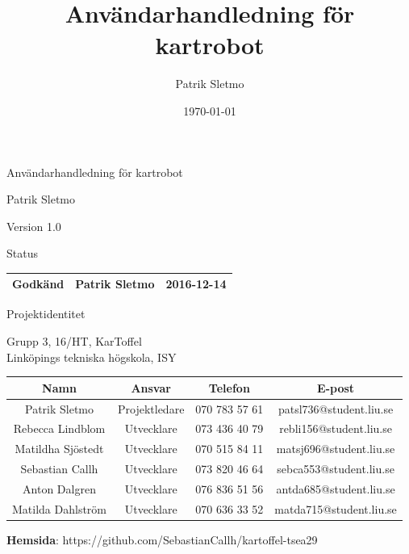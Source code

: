 \documentclass{article}
\title{Användarhandledning för kartrobot}
\author{Patrik Sletmo}
\date{\today}
\begin{document}
\thispagestyle{empty}

{
\sffamily
\centering
\large


{\huge 
Användarhandledning för kartrobot
}

{\large
Patrik Sletmo
}

{\large
Version 1.0
}

\vspace{3.5cm}

Status
\begin{table}[H]
\centering
\begin{tabular}{ | c | c | c | }
\hline
Godkänd & Patrik Sletmo & 2016-12-14 \\
\hline
\end{tabular}
\end{table}
}
\clearpage

\vspace*{\fill}
{
\sffamily
\centering
\large


{\huge
Projektidentitet
}

{\large
Grupp 3, 16/HT, KarToffel \\ Linköpings tekniska högskola, ISY
}

\vspace{0.5cm}

\begin{table}[H]
\centering
\begin{tabular}{ | c | c | c | c |}
\hline
Namn & Ansvar & Telefon & E-post \\
\hline
Patrik Sletmo & Projektledare & 070 783 57 61 & patsl736@student.liu.se \\
\hline
Rebecca Lindblom & Utvecklare & 073 436 40 79 & rebli156@student.liu.se \\
\hline
Matildha Sjöstedt & Utvecklare & 070 515 84 11 & matsj696@student.liu.se \\
\hline
Sebastian Callh & Utvecklare & 073 820 46 64 & sebca553@student.liu.se \\
\hline
Anton Dalgren & Utvecklare & 076 836 51 56 & antda685@student.liu.se \\
\hline
Matilda Dahlström & Utvecklare & 070 636 33 52 & matda715@student.liu.se \\
\hline
\end{tabular}
\end{table}
}

\begin{center}
\textbf{Hemsida}: https://github.com/SebastianCallh/kartoffel-tsea29
\end{center}
\end{document}
